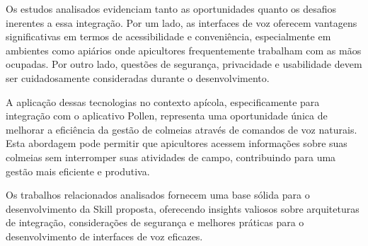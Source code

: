 Os estudos analisados evidenciam tanto as oportunidades quanto os desafios inerentes a essa integração. Por um lado, as interfaces de voz oferecem vantagens significativas em termos de acessibilidade e conveniência, 
especialmente em ambientes como apiários onde apicultores frequentemente trabalham com as mãos ocupadas. Por outro lado, questões de segurança, privacidade e usabilidade devem ser cuidadosamente consideradas durante o desenvolvimento.

A aplicação dessas tecnologias no contexto apícola, especificamente para integração com o aplicativo Pollen, representa uma oportunidade única de melhorar a eficiência da gestão de colmeias através de comandos de voz naturais. 
Esta abordagem pode permitir que apicultores acessem informações sobre suas colmeias sem interromper suas atividades de campo, contribuindo para uma gestão mais eficiente e produtiva.

Os trabalhos relacionados analisados fornecem uma base sólida para o desenvolvimento da Skill proposta, oferecendo insights valiosos sobre arquiteturas de integração, considerações de segurança e melhores práticas para o desenvolvimento de interfaces de voz eficazes.
















